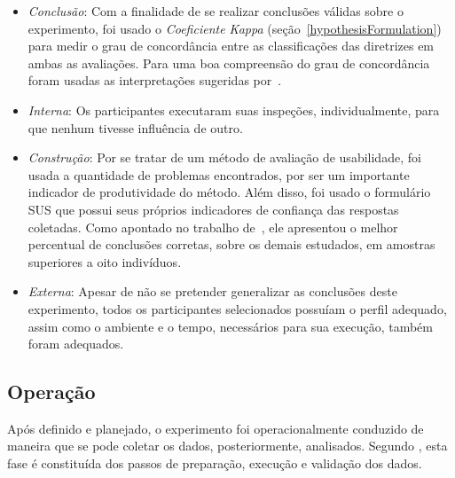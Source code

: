 \begin{itemize}

  \item {\em  Conclusão}: Com a  finalidade de se  realizar conclusões
    válidas sobre  o experimento, foi usado o  {\em Coeficiente Kappa}
    (seção~\ref{hypothesisFormulation})   para   medir   o   grau   de
    concordância entre  as classificações  das diretrizes em  ambas as
    avaliações.   Para uma  boa  compreensão do  grau de  concordância
    foram        usadas       as        interpretações       sugeridas
    por~.

  \item  {\em Interna}:  Os participantes  executaram  suas inspeções,
    individualmente, para que nenhum tivesse influência de outro.

  \item {\em Construção}:  Por se tratar de um  método de avaliação de
    usabilidade, foi usada a  quantidade de problemas encontrados, por
    ser  um importante  indicador  de produtividade  do método.   Além
    disso,  foi  usado  o  formulário  SUS que  possui  seus  próprios
    indicadores de  confiança das respostas  coletadas.  Como apontado
    no trabalho  de~, ele apresentou o
    melhor  percentual   de  conclusões  corretas,   sobre  os  demais
    estudados, em amostras superiores a oito indivíduos.

  \item  {\em Externa}:  Apesar  de não  se  pretender generalizar  as
    conclusões deste experimento,  todos os participantes selecionados
    possuíam  o perfil  adequado, assim  como  o ambiente  e o  tempo,
    necessários para sua execução, também foram adequados.

\end{itemize}

\subsection{Operação}
\label{operation}

Após  definido   e  planejado,  o   experimento  foi  operacionalmente
conduzido  de maneira que  se pode  coletar os  dados, posteriormente,
analisados.    Segundo  ,  esta   fase  é
constituída dos passos de preparação, execução e validação dos dados.

